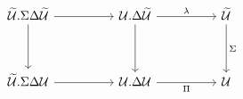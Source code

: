 \[\begin{tikzcd}
	{\Tm.\Sigma\Delta\Tm} && {\Ty.\Delta\Tm} && \Tm \\
	\\
	{\Tm.\Sigma\Delta\Ty} && {\Ty.\Delta\Ty} && \Ty
	\arrow[from=3-1, to=3-3]
	\arrow[from=1-3, to=3-3]
	\arrow[from=1-1, to=3-1]
	\arrow[from=1-1, to=1-3]
	\arrow["\Pi"', from=3-3, to=3-5]
	\arrow["\lambda", from=1-3, to=1-5]
	\arrow["\Sigma", from=1-5, to=3-5]
\end{tikzcd}\]